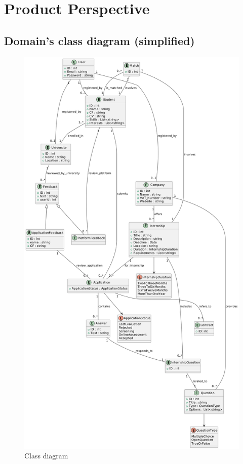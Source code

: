 \section{Product Perspective}
\subsection{Domain's class diagram (simplified)}
\begin{figure}[!ht]
    \centering
    \includegraphics[scale=0.23]{Images/ImagesRASD/domainFinal.png}
    \caption{Class diagram}
\end{figure}

